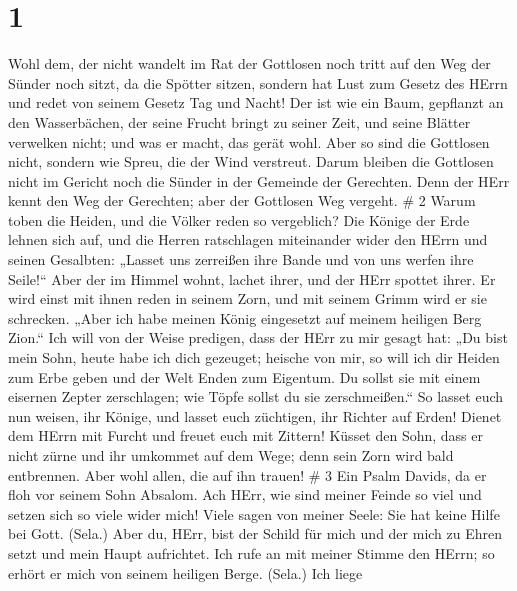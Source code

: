 \hypertarget{section}{%
\section{1}\label{section}}

 Wohl dem, der nicht wandelt im Rat der Gottlosen noch tritt
auf den Weg der Sünder noch sitzt, da die Spötter sitzen, 
sondern hat Lust zum Gesetz des HErrn und redet von seinem Gesetz Tag
und Nacht!  Der ist wie ein Baum, gepflanzt an den
Wasserbächen, der seine Frucht bringt zu seiner Zeit, und seine Blätter
verwelken nicht; und was er macht, das gerät wohl.  Aber so
sind die Gottlosen nicht, sondern wie Spreu, die der Wind verstreut.
 Darum bleiben die Gottlosen nicht im Gericht noch die
Sünder in der Gemeinde der Gerechten.  Denn der HErr kennt
den Weg der Gerechten; aber der Gottlosen Weg vergeht. \# 2 
Warum toben die Heiden, und die Völker reden so vergeblich? 
Die Könige der Erde lehnen sich auf, und die Herren ratschlagen
miteinander wider den HErrn und seinen Gesalbten:  „Lasset
uns zerreißen ihre Bande und von uns werfen ihre Seile!{}`` 
Aber der im Himmel wohnt, lachet ihrer, und der HErr spottet ihrer.
 Er wird einst mit ihnen reden in seinem Zorn, und mit
seinem Grimm wird er sie schrecken.  „Aber ich habe meinen
König eingesetzt auf meinem heiligen Berg Zion.``  Ich will
von der Weise predigen, dass der HErr zu mir gesagt hat: „Du bist mein
Sohn, heute habe ich dich gezeuget;  heische von mir, so
will ich dir Heiden zum Erbe geben und der Welt Enden zum Eigentum.
 Du sollst sie mit einem eisernen Zepter zerschlagen; wie
Töpfe sollst du sie zerschmeißen.``  So lasset euch nun
weisen, ihr Könige, und lasset euch züchtigen, ihr Richter auf Erden!
 Dienet dem HErrn mit Furcht und freuet euch mit Zittern!
 Küsset den Sohn, dass er nicht zürne und ihr umkommet auf
dem Wege; denn sein Zorn wird bald entbrennen. Aber wohl allen, die auf
ihn trauen! \# 3  Ein Psalm Davids, da er floh vor seinem
Sohn Absalom.  Ach HErr, wie sind meiner Feinde so viel und
setzen sich so viele wider mich!  Viele sagen von meiner
Seele: Sie hat keine Hilfe bei Gott. (Sela.)  Aber du, HErr,
bist der Schild für mich und der mich zu Ehren setzt und mein Haupt
aufrichtet.  Ich rufe an mit meiner Stimme den HErrn; so
erhört er mich von seinem heiligen Berge. (Sela.)  Ich liege

